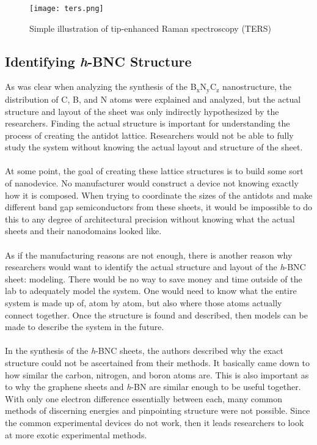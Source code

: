 \documentclass[11pt]{article}
\newcommand{\sub}[1]{\ensuremath{_{\textrm{#1}}}}
\begin{document}
\begin{multicols}{2}
\begin{figure*}
\begin{center}
  \texttt{[image: ters.png]}
  \caption{Simple illustration of tip-enhanced Raman spectroscopy (TERS)\cite{ters}}
  \label{fig:ters}
\end{center}
\end{figure*}

\subsection{Identifying \textit{h}-BNC Structure}
As was clear when analyzing the synthesis of the B\sub{x}N\sub{y}C\sub{z} nanostructure, the distribution of C, B, and N atoms were explained and analyzed, but the actual structure and layout of the sheet was only indirectly hypothesized by the researchers. Finding the actual structure is important for understanding the process of creating the antidot lattice. Researchers would not be able to fully study the system without knowing the actual layout and structure of the sheet. \\ \\

At some point, the goal of creating these lattice structures is to build some sort of nanodevice. No manufacturer would construct a device not knowing exactly how it is composed. When trying to coordinate the sizes of the antidots and make different band gap semiconductors from these sheets, it would be impossible to do this to any degree of architectural precision without knowing what the actual sheets and their nanodomains looked like. \\ \\

As if the manufacturing reasons are not enough, there is another reason why researchers would want to identify the actual structure and layout of the \textit{h}-BNC sheet: modeling. There would be no way to save money and time outside of the lab to adequately model the system.  One would need to know what the entire system is made up of, atom by atom, but also where those atoms actually connect together. Once the structure is found and described, then models can be made to describe the system in the future. \\ \\

In the synthesis of the \textit{h}-BNC sheets, the authors described why the exact structure could not be ascertained from their methods. It basically came down to how similar the carbon, nitrogen, and boron atoms are. This is also important as to why the graphene sheets and \textit{h}-BN are similar enough to be useful together. With only one electron difference essentially between each, many common methods of discerning energies and pinpointing structure were not possible.\cite{synth} Since the common experimental devices do not work, then it leads researchers to look at more exotic experimental methods. \\ \\


\end{multicols}
\end{document}
